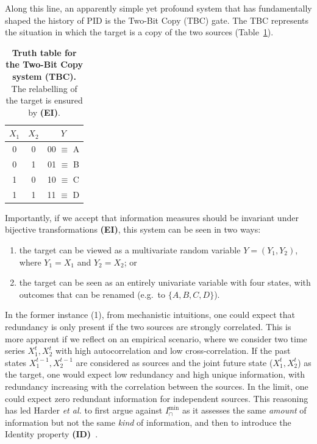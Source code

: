 \documentclass{article}
\makeatletter
\newcommand{\etal}{\textit{et al.\@} }
\newcommand{\ID}{\textbf{(ID)}\xspace} %
\newcommand{\EI}{\textbf{(EI)}\xspace} %
\newcommand{\Imin}{\ensuremath{I_\cap^{\text{min}}}\xspace}
\newenvironment{DIFnomarkup}{}
\makeatother
\begin{document}
Along this line, an apparently simple yet profound system that has fundamentally shaped the history of PID is the Two-Bit Copy (TBC) gate. The TBC represents the situation in which the target is a copy of the two sources (Table~\ref{tab:TBC}). 
\begin{DIFnomarkup}
\begin{table}[t]
    \centering
    \begin{tabular}{ccc}
    \toprule
         $X_1$ & $X_2$ & $Y$ \\
    \midrule
         0 & 0 & 00 $\equiv$ A \\
         0 & 1 & 01 $\equiv$ B \\
         1 & 0 & 10 $\equiv$ C \\
         1 & 1 & 11 $\equiv$ D \\
     \bottomrule
    \end{tabular}
    \caption{\textbf{Truth table for the Two-Bit Copy system (TBC).}  The relabelling of the target is ensured by \EI.}
    \label{tab:TBC}
\end{table}
\end{DIFnomarkup}
Importantly, if we accept that information measures should be invariant under bijective transformations \EI, this system can be seen in two ways:
\begin{enumerate}
    \item the target can be viewed as a multivariate random variable $Y=(Y_1,Y_2)$, where $Y_1=X_1$ and $Y_2=X_2$; or
    \item the target can be seen as an entirely univariate variable with four states, with outcomes that can be renamed (e.g.\ to $\{A,B,C,D\}$). 
\end{enumerate}
In the former instance (1), from mechanistic intuitions, one could expect that redundancy is only present if the two sources are strongly correlated. This is more apparent if we reflect on an empirical scenario, where we consider two time series $X_1^t,X_2^t$ with high autocorrelation and low cross-correlation. If the past states $X_1^{t-1},X_2^{t-1}$ are considered as sources and the joint future state ($X_1^t,X_2^t$) as the target, one would expect low redundancy and high unique information, with redundancy increasing with the correlation between the sources. In the limit, one could expect zero redundant information for independent sources. This reasoning has led Harder \etal to first argue against \Imin as it assesses the same \textit{amount} of information but not the same \textit{kind} of information, and then to introduce the Identity property \ID~\cite{harder2013bivariate}.
\end{document}
